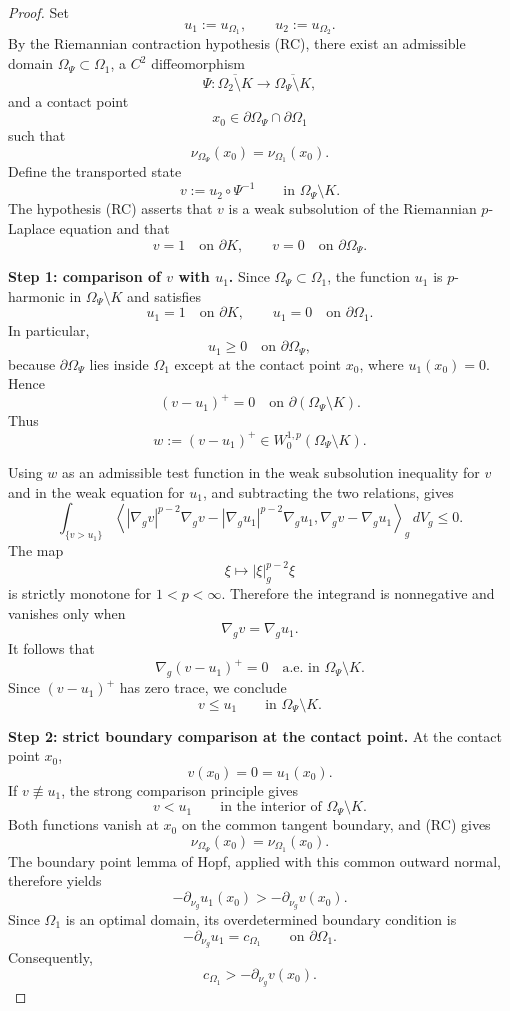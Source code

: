 \documentclass[11pt,a4paper]{article}
\theoremstyle{definition}
\theoremstyle{remark}
\begin{document}
\begin{proof}
Set
\[
u_1:=u_{\Omega_1},
\qquad
u_2:=u_{\Omega_2}.
\]
By the Riemannian contraction hypothesis {\rm (RC)}, there exist an
admissible domain $\Omega_\Psi\subset\Omega_1$, a $C^2$ diffeomorphism
\[
\Psi:
\overline{\Omega_2\setminus K}
\longrightarrow
\overline{\Omega_\Psi\setminus K},
\]
and a contact point
\[
x_0\in\partial\Omega_\Psi\cap\partial\Omega_1
\]
such that
\[
\nu_{\Omega_\Psi}(x_0)=\nu_{\Omega_1}(x_0).
\]
Define the transported state
\[
v:=u_2\circ\Psi^{-1}
\qquad\text{in }\Omega_\Psi\setminus K.
\]
The hypothesis {\rm (RC)} asserts that $v$ is a weak subsolution of the
Riemannian $p$-Laplace equation and that
\[
v=1\quad\text{on }\partial K,
\qquad
v=0\quad\text{on }\partial\Omega_\Psi.
\]

\medskip
\noindent\textbf{Step 1: comparison of $v$ with $u_1$.}
Since $\Omega_\Psi\subset\Omega_1$, the function $u_1$ is
$p$-harmonic in $\Omega_\Psi\setminus K$ and satisfies
\[
u_1=1\quad\text{on }\partial K,
\qquad
u_1=0\quad\text{on }\partial\Omega_1.
\]
In particular,
\[
u_1\geq0\quad\text{on }\partial\Omega_\Psi,
\]
because $\partial\Omega_\Psi$ lies inside $\Omega_1$ except at the
contact point $x_0$, where $u_1(x_0)=0$. Hence
\[
(v-u_1)^+=0
\quad\text{on }\partial(\Omega_\Psi\setminus K).
\]
Thus
\[
w:=(v-u_1)^+\in W_0^{1,p}(\Omega_\Psi\setminus K).
\]

Using $w$ as an admissible test function in the weak subsolution
inequality for $v$ and in the weak equation for $u_1$, and subtracting
the two relations, gives
\[
\int_{\{v>u_1\}}
\left\langle
|\nabla_gv|^{p-2}\nabla_gv
-
|\nabla_gu_1|^{p-2}\nabla_gu_1,
\nabla_gv-\nabla_gu_1
\right\rangle_g\,dV_g
\leq0.
\]
The map
\[
\xi\longmapsto|\xi|_g^{p-2}\xi
\]
is strictly monotone for $1<p<\infty$. Therefore the integrand is
nonnegative and vanishes only when
\[
\nabla_gv=\nabla_gu_1.
\]
It follows that
\[
\nabla_g(v-u_1)^+=0
\quad\text{a.e. in }\Omega_\Psi\setminus K.
\]
Since $(v-u_1)^+$ has zero trace, we conclude
\[
v\leq u_1
\qquad\text{in }\Omega_\Psi\setminus K.
\]

\medskip
\noindent\textbf{Step 2: strict boundary comparison at the contact point.}
At the contact point $x_0$,
\[
v(x_0)=0=u_1(x_0).
\]
If $v\not\equiv u_1$, the strong comparison principle gives
\[
v<u_1
\qquad\text{in the interior of }\Omega_\Psi\setminus K.
\]
Both functions vanish at $x_0$ on the common tangent boundary, and
{\rm (RC)} gives
\[
\nu_{\Omega_\Psi}(x_0)=\nu_{\Omega_1}(x_0).
\]
The boundary point lemma of Hopf, applied with this common outward
normal, therefore yields
\[
-\partial_{\nu_g}u_1(x_0)
>
-\partial_{\nu_g}v(x_0).
\]
Since $\Omega_1$ is an optimal domain, its overdetermined boundary
condition is
\[
-\partial_{\nu_g}u_1=c_{\Omega_1}
\qquad\text{on }\partial\Omega_1.
\]
Consequently,
\[
c_{\Omega_1}>
-\partial_{\nu_g}v(x_0).
\]


\end{proof}
\end{document}
